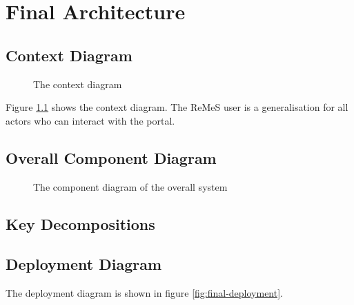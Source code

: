 \chapter{Final Architecture}
\label{chap:final-architecture}

\section{Context Diagram}

\begin{figure}
	\begin{centering}
		\caption{The context diagram}
		\label{fig:final-context}
	\end{centering}
\end{figure}

\npar Figure \ref{fig:final-context} shows the context diagram. The ReMeS
user is a generalisation for all actors who can interact with the portal. 

\section{Overall Component Diagram}

\begin{figure}
	\begin{centering}
		\caption{The component diagram of the overall system}
		\label{fig:final-components}
	\end{centering}
\end{figure}

\section{Key Decompositions}


\section{Deployment Diagram}

\npar The deployment diagram is shown in figure \ref{fig:final-deployment}. 

